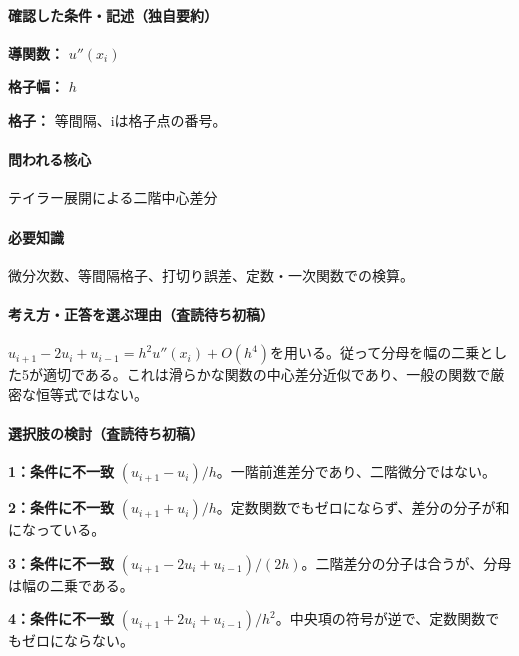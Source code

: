 \paragraph{確認した条件・記述（独自要約）}\mbox{}\par

\noindent\textbf{導関数：} \(u''(x_i)\)\par

\noindent\textbf{格子幅：} \(h\)\par

\noindent\textbf{格子：} 等間隔、iは格子点の番号。\par

\paragraph{問われる核心} テイラー展開による二階中心差分

\paragraph{必要知識} 微分次数、等間隔格子、打切り誤差、定数・一次関数での検算。

\paragraph{考え方・正答を選ぶ理由（査読待ち初稿）} \(u_{i+1}-2u_i+u_{i-1}=h^2u''(x_i)+O(h^4)\)を用いる。従って分母を幅の二乗とした5が適切である。これは滑らかな関数の中心差分近似であり、一般の関数で厳密な恒等式ではない。

\paragraph{選択肢の検討（査読待ち初稿）}\mbox{}\par

\noindent\textbf{1：条件に不一致} \((u_{i+1}-u_i)/h\)。一階前進差分であり、二階微分ではない。\par

\noindent\textbf{2：条件に不一致} \((u_{i+1}+u_i)/h\)。定数関数でもゼロにならず、差分の分子が和になっている。\par

\noindent\textbf{3：条件に不一致} \((u_{i+1}-2u_i+u_{i-1})/(2h)\)。二階差分の分子は合うが、分母は幅の二乗である。\par

\noindent\textbf{4：条件に不一致} \((u_{i+1}+2u_i+u_{i-1})/h^2\)。中央項の符号が逆で、定数関数でもゼロにならない。\par

